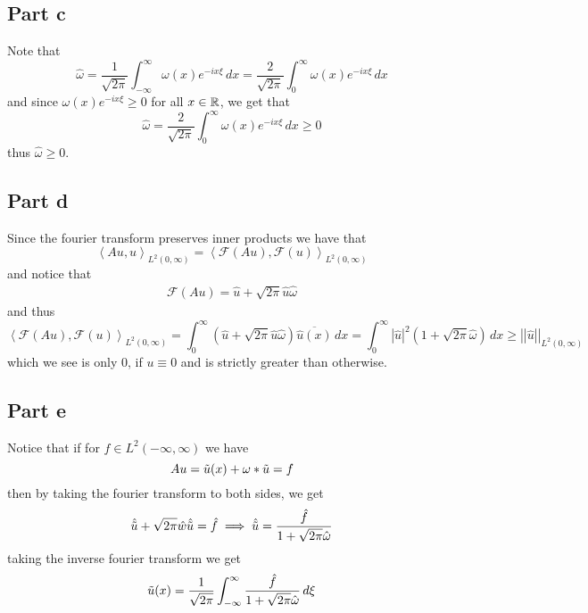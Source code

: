 \documentclass[12pt]{report}
\newcommand{\norm}[1]{\left|\left|#1\right|\right|}
\newcommand{\inner}[2]{\left\langle#1,#2\right\rangle}
\begin{document}
\subsection*{Part c}
Note that
\begin{equation*}
    \hat{\omega} = \frac{1}{\sqrt{2\pi}} \int_{-\infty}^\infty \omega(x) e^{-ix\xi} \, dx = \frac{2}{\sqrt{2\pi}} \int_{0}^\infty \omega(x) e^{-ix\xi} \, dx 
\end{equation*}
and since $\omega(x) e^{-ix\xi} \geq 0$ for all $x \in \mathbb{R}$, we get that
\begin{equation*}
     \hat{\omega} =  \frac{2}{\sqrt{2\pi}} \int_{0}^\infty \omega(x) e^{-ix\xi} \, dx \geq 0
\end{equation*}
thus $\hat{\omega} \geq 0$.

\subsection*{Part d}
Since the fourier transform preserves inner products we have that
\begin{equation*}
    \inner{Au}{u}_{L^2(0,\infty)} = \inner{\mathcal{F}(Au)}{\mathcal{F}(u)}_{L^2(0,\infty)}
\end{equation*}
and notice that
\begin{align*}
    \mathcal{F}(Au) = \hat{u} + \sqrt{2\pi} \hat{u} \hat{\omega}
\end{align*}
and thus
\begin{equation*}
    \inner{\mathcal{F}(Au)}{\mathcal{F}(u)}_{L^2(0,\infty)} = \int_{0}^\infty \left(\hat{u} + \sqrt{2\pi} \hat{u} \hat{\omega}\right) \overline{\hat{u}(x)} \, dx = \int_0^\infty |\hat{u}|^2 (1 + \sqrt{2\pi} \hat{\omega})\, dx \geq \norm{\hat{u}}_{L^2(0,\infty)}
\end{equation*}
which we see is only $0$, if $u \equiv 0$ and is strictly greater than otherwise.

\subsection*{Part e}
Notice that if for $f \in L^2(-\infty, \infty)$ we have 
\begin{equation*}
    Au = \Tilde{u}(x) + \omega * \Tilde{u} = f
\end{equation*}
then by taking the fourier transform to both sides, we get
\begin{align*}
    \hat{\Tilde{u}} + \sqrt{2\pi} \hat{w}\hat{\Tilde{u}} = \hat{f} \implies \hat{\Tilde{u}} = \frac{\hat{f}}{1 + \sqrt{2\pi} \hat{\omega}}
\end{align*}
taking the inverse fourier transform we get
\begin{equation*}
    \Tilde{u}(x) = \frac{1}{\sqrt{2\pi}} \int_{-\infty}^\infty \frac{\hat{f}}{1 + \sqrt{2\pi} \hat{\omega}}\, d\xi
\end{equation*}
\end{document}
